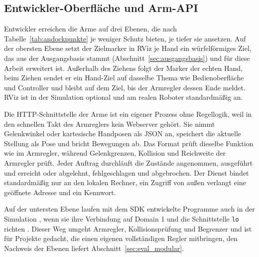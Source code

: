 \subsection{Entwickler-Oberfläche und Arm-API}
\label{sec:entwickler_api}
Entwickler erreichen die Arme auf drei Ebenen, die nach Tabelle~\ref{tab:andockpunkte} je weniger Schutz bieten, je tiefer sie ansetzen.
Auf der obersten Ebene setzt der Zielmarker in RViz je Hand ein würfelförmiges Ziel, das aus der Ausgangsbasis stammt (Abschnitt~\ref{sec:ausgangsbasis}) und für diese Arbeit erweitert ist.
Außerhalb des Ziehens folgt der Marker der echten Hand, beim Ziehen sendet er ein Hand-Ziel auf dasselbe Thema wie Bedienoberfläche und Controller und bleibt auf dem Ziel, bis der Armregler dessen Ende meldet.
RViz ist in der Simulation optional und am realen Roboter standardmäßig an.

Die HTTP-Schnittstelle der Arme ist ein eigener Prozess ohne Regellogik, weil in den schnellen Takt des Armreglers kein Webserver gehört.
Sie nimmt Gelenkwinkel oder kartesische Handposen als \ac{JSON} an, speichert die aktuelle Stellung als Pose und bricht Bewegungen ab.
Das Format prüft dieselbe Funktion wie im Armregler, während Gelenkgrenzen, Kollision und Reichweite der Armregler prüft.
Jeder Auftrag durchläuft die Zustände angenommen, ausgeführt und erreicht oder abgelehnt, fehlgeschlagen und abgebrochen.
Der Dienst bindet standardmäßig nur an den lokalen Rechner, ein Zugriff von außen verlangt eine geöffnete Adresse und ein Kennwort.

Auf der untersten Ebene laufen mit dem SDK entwickelte Programme auch in der Simulation \cite{UnitreeMujoco}, wenn sie ihre Verbindung auf Domain 1 und die Schnittstelle \texttt{lo} richten \cite{UnitreeMujoco}.
Dieser Weg umgeht Armregler, Kollisionsprüfung und Begrenzer und ist für Projekte gedacht, die einen eigenen vollständigen Regler mitbringen, den Nachweis der Ebenen liefert Abschnitt~\ref{sec:eval_modular}.

